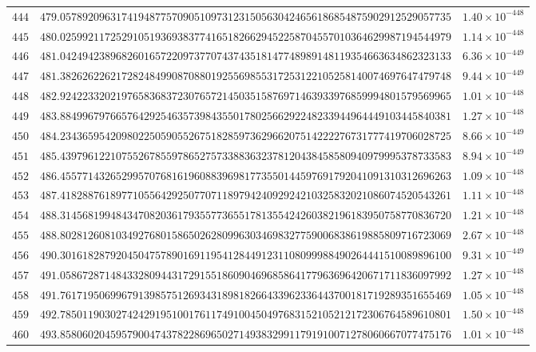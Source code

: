 \documentclass[12pt,reqno]{amsart}
\theoremstyle{remark}
\begin{document}
\begin{longtable}{clc}
$444$ & $479.0578920963174194877570905109731231505630424656186854875902912529057735$ & $1.40\times 10^{-448}$ \\
$445$ & $480.0259921172529105193693837741651826629452258704557010364629987194544979$ & $1.14\times 10^{-448}$ \\
$446$ & $481.0424942389682601657220973770743743518147748989148119354663634862323133$ & $6.36\times 10^{-449}$ \\
$447$ & $481.3826262262172824849908708801925569855317253122105258140074697647479748$ & $9.44\times 10^{-449}$ \\
$448$ & $482.9242233202197658368372307657214503515876971463933976859994801579569965$ & $1.01\times 10^{-448}$ \\
$449$ & $483.8849967976657642925463573984355017802566292248233944964449103445840381$ & $1.27\times 10^{-448}$ \\
$450$ & $484.2343659542098022505905526751828597362966207514222276731777419706028725$ & $8.66\times 10^{-449}$ \\
$451$ & $485.4397961221075526785597865275733883632378120438458580940979995378733583$ & $8.94\times 10^{-449}$ \\
$452$ & $486.4557714326529957076816196088396981773550144597691792041091310312696263$ & $1.09\times 10^{-448}$ \\
$453$ & $487.4182887618977105564292507707118979424092924210325832021086074520543261$ & $1.11\times 10^{-448}$ \\
$454$ & $488.3145681994843470820361793557736551781355424260382196183950758770836720$ & $1.21\times 10^{-448}$ \\
$455$ & $488.8028126081034927680158650262809963034698327759006838619885809716723069$ & $2.67\times 10^{-448}$ \\
$456$ & $490.3016182879204504757890169119541284491231108099988490264441510089896100$ & $9.31\times 10^{-449}$ \\
$457$ & $491.0586728714843328094431729155186090469685864177963696420671711836097992$ & $1.27\times 10^{-448}$ \\
$458$ & $491.7617195069967913985751269343189818266433962336443700181719289351655469$ & $1.05\times 10^{-448}$ \\
$459$ & $492.7850119030274242919510017611749100450497683152105212172306764589610801$ & $1.50\times 10^{-448}$ \\
$460$ & $493.8580602045957900474378228696502714938329911791910071278060667077475176$ & $1.01\times 10^{-448}$ \\

\end{longtable}
\end{document}

